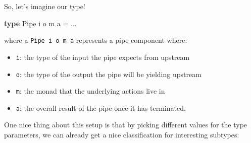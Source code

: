 \documentclass[]{article}
\newenvironment{Shaded}{}{}
\newcommand{\DataTypeTok}[1]{\textcolor[rgb]{0.56,0.13,0.00}{#1}}
\newcommand{\KeywordTok}[1]{\textcolor[rgb]{0.00,0.44,0.13}{\textbf{#1}}}
\newcommand{\NormalTok}[1]{#1}
\newcommand{\OperatorTok}[1]{\textcolor[rgb]{0.40,0.40,0.40}{#1}}
\newcommand{\OtherTok}[1]{\textcolor[rgb]{0.00,0.44,0.13}{#1}}
\begin{document}
So, let's imagine our type!

\begin{Shaded}
\begin{Highlighting}[]
\KeywordTok{type} \DataTypeTok{Pipe}\NormalTok{ i o m a }\OtherTok{=} \OperatorTok{...}
\end{Highlighting}
\end{Shaded}

where a \texttt{Pipe\ i\ o\ m\ a} represents a pipe component where:

\begin{itemize}
\tightlist
\item
  \texttt{i}: the type of the input the pipe expects from upstream
\item
  \texttt{o}: the type of the output the pipe will be yielding upstream
\item
  \texttt{m}: the monad that the underlying actions live in
\item
  \texttt{a}: the overall result of the pipe once it has terminated.
\end{itemize}

One nice thing about this setup is that by picking different values for the type
parameters, we can already get a nice classification for interesting subtypes:
\end{document}
